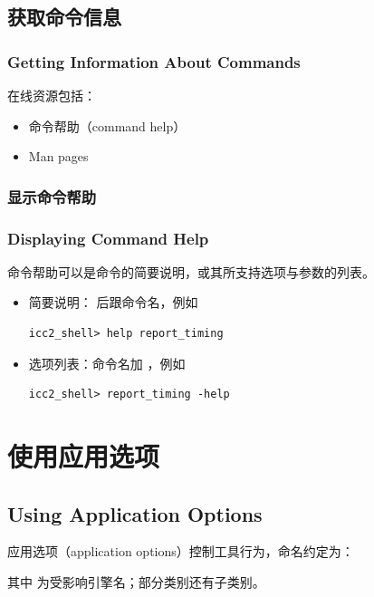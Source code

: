 \subsection{获取命令信息}
\subsubsection*{Getting Information About Commands}

在线资源包括：
\begin{itemize}
  \item 命令帮助（command help）
  \item Man pages
\end{itemize}

\subsubsection{显示命令帮助}
\subsubsection*{Displaying Command Help}

命令帮助可以是命令的简要说明，或其所支持选项与参数的列表。
\begin{itemize}
  \item 简要说明： 后跟命令名，例如
\begin{lstlisting}
icc2_shell> help report_timing
\end{lstlisting}
  \item 选项列表：命令名加 ，例如
\begin{lstlisting}
icc2_shell> report_timing -help
\end{lstlisting}
\end{itemize}

\section{使用应用选项}
\subsection*{Using Application Options}

应用选项（application options）控制工具行为，命名约定为：
\begin{center}
\end{center}
其中  为受影响引擎名；部分类别还有子类别。

